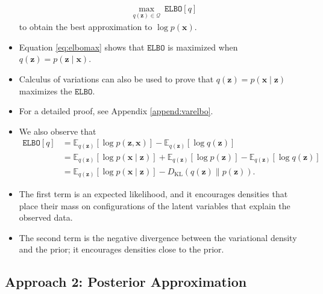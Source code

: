 \documentclass[10pt]{article}
\newcommand{\EE}{\mathbb{E}}
\newcommand{\QQ}{\mathcal{Q}}
\newcommand{\elbo}{\texttt{ELBO}}
\newcommand{\KL}{D_{\text{KL}}}
\begin{document}
\begin{itemize}
\begin{align*}
\max_{q(\bm{z}) \in \QQ} \ \elbo[q]
\end{align*}
to obtain the best approximation to $\log p(\bm{x})$.
\item Equation \eqref{eq:elbomax} shows that $\elbo$ is maximized when $q(\bm{z}) = p(\bm{z} \mid \bm{x})$.
\item Calculus of variations can also be used to prove that $q(\bm{z}) = p(\bm{x} \mid \bm{z})$ maximizes the $\elbo$.
\item For a detailed proof, see Appendix \ref{append:varelbo}.
\item We also observe that
\begin{align} \label{eq:elbo2}
\elbo[q] &= \EE_{q(\bm{z})} [ \log p(\bm{z},\bm{x}) ] - \EE_{q(\bm{z})} [\log q(\bm{z})] \nonumber \\
&= \EE_{q(\bm{z})}[\log p(\bm{x} \mid \bm{z})] + \EE_{q(\bm{z})}[ \log p(\bm{z}) ] - \EE_{q(\bm{z})} [\log q(\bm{z})] \nonumber \\
&= \EE_{q(\bm{z})}[\log p(\bm{x} \mid \bm{z})] - \KL(q(\bm{z}) \| p(\bm{z})).
\end{align}
\item The first term is an expected likelihood, and it encourages densities that place their mass on configurations of the latent variables that explain the observed data.
\item The second term is the negative divergence between the variational density and the prior; it encourages densities close to the prior.
\end{itemize}

\subsection{Approach 2: Posterior Approximation}
\end{document}

